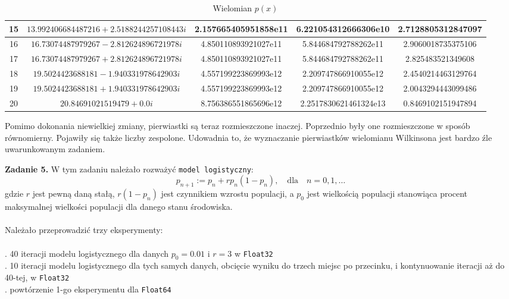 \documentclass[15pt, a4paper]{article}
\begin{document}
\begin{table}[h]
\begin{adjustbox}{max width=\textwidth}
\begin{tabular}{|c|c|c|c|c|}
        15 & \(13.992406684487216 + 2.5188244257108443i\) & 2.157665405951858e11 & 6.221054312666306e10 & 2.7128805312847097 \\ \hline
        16 & \(16.73074487979267 - 2.812624896721978i\) & 4.850110893921027e11 & 5.844684792788262e11 & 2.9060018735375106 \\ \hline
        17 & \(16.73074487979267 + 2.812624896721978i\) & 4.850110893921027e11 & 5.844684792788262e11 & 2.825483521349608 \\ \hline
        18 & \(19.5024423688181 - 1.940331978642903i\) & 4.557199223869993e12 & 2.209747866910055e12 & 2.4540214463129764 \\ \hline
        19 & \(19.5024423688181 + 1.940331978642903i\) & 4.557199223869993e12 & 2.209747866910055e12 & 2.0043294443099486 \\ \hline
        20 & \(20.84691021519479 + 0.0i\) & 8.756386551865696e12 & 2.2517830621461324e13 & 0.8469102151947894 \\ \hline
    \end{tabular}
    \end{adjustbox}
    \caption{Wielomian \(p(x)\)}
    \label{wielomian p}
\end{table}

\vspace{0.5cm}

\noindent Pomimo dokonania niewielkiej zmiany, pierwiastki są teraz rozmieszczone inaczej. Poprzednio były one rozmieszczone w sposób równomierny. Pojawiły się także liczby zespolone. Udowadnia to, że wyznaczanie pierwiastków wielomianu Wilkinsona jest bardzo źle uwarunkowanym zadaniem.

\vspace{0.5cm}

\pagebreak

\noindent\hrulefill


\vspace{0.5cm}

\noindent\textbf{Zadanie 5.} W tym zadaniu należało rozważyć \verb|model logistyczny|:
\[
p_{n+1} := p_n + r p_n (1 - p_n), \quad \mathrm{dla } \quad n = 0, 1, \ldots
\]
gdzie \(r\) jest pewną daną stałą, \(r(1 - p_n)\) jest czynnikiem wzrostu populacji, a \(p_0\) jest
wielkością populacji stanowiąca procent maksymalnej wielkości populacji dla danego
stanu środowiska.\\\\
\noindent Należało przeprowadzić trzy eksperymenty: \\\\
. 40 iteracji modelu logistycznego dla danych \(p_0 = 0.01\) i \(r = 3\) w \verb|Float32| \\
. 10 iteracji modelu logistycznego dla tych samych danych, obcięcie wyniku do trzech miejsc po przecinku, i kontynuowanie iteracji aż do 40-tej, w \verb|Float32| \\
. powtórzenie 1-go eksperymentu dla \verb|Float64| \\\\
\end{document}

